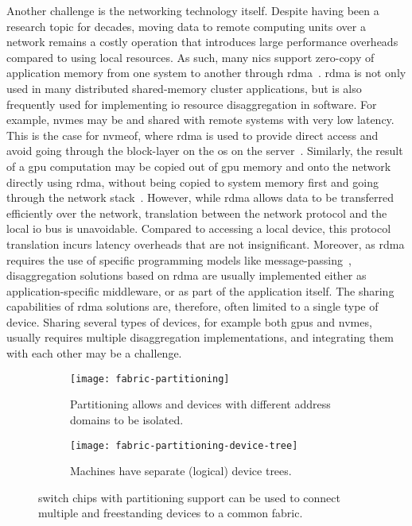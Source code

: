Another challenge is the networking technology itself. 
%
Despite having been a research topic for decades, moving data to remote computing units over a network remains a costly operation that introduces large performance overheads compared to using local resources.
%
As such, many \glspl{nic} support zero-copy of application memory from one system to another through \gls{rdma}~\cite{Huang2012}.
%
\Gls{rdma} is not only used in many distributed shared-memory cluster applications, but is also frequently used for implementing \gls{io} resource \gls{disaggregation} in software.
%
For example, \glspl{nvme} may be  and shared with remote systems with very low latency.
This is the case for \gls{nvmeof}, where \gls{rdma} is used to provide direct access and avoid going through the block-layer on the \gls{os} on the server~\cite{Guz2018}.
%
Similarly, the result of a \gls{gpu} computation may be copied out of \gls{gpu} memory and onto the network directly using \gls{rdma}, without being copied to system memory first and going through the network stack~\cite{Venkatesh2014}.
%
However, while \gls{rdma} allows data to be transferred efficiently over the network, translation between the network protocol and the local \gls{io} bus is unavoidable. 
%
Compared to accessing a local device, this protocol translation incurs latency overheads that are not insignificant.
%
Moreover, as \gls{rdma} requires the use of specific programming models like message-passing~\cite{Jiang2004}, \gls{disaggregation} solutions based on \gls{rdma} are usually implemented either as application-specific \gls{middleware}, or as part of the application itself.
%
The sharing capabilities of \gls{rdma} solutions are, therefore, often limited to a single type of device.
Sharing several types of devices, for example both \glspl{gpu} and \glspl{nvme}, usually requires multiple \gls{disaggregation} implementations, and integrating them with each other may be a challenge.



\begin{figure}
    \centering
    \begin{subfigure}{\linewidth}
        \centering
        \texttt{[image: fabric-partitioning]}
        \caption{Partitioning allows  and devices with different address domains to be isolated.}
    \end{subfigure}
    \par\vspace{5mm}
    \begin{subfigure}{\linewidth}
        \centering
        \texttt{[image: fabric-partitioning-device-tree]}
        \caption{Machines have separate (logical)  device trees.}
    \end{subfigure}
    \caption{ switch chips with partitioning support can be used to connect multiple  and freestanding devices to a common  fabric.}
  	\label{fig:partitioning}
\end{figure}



